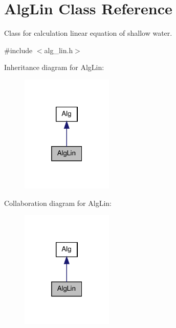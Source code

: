\hypertarget{classAlgLin}{
\section{AlgLin Class Reference}
\label{classAlgLin}
}


Class for calculation linear equation of shallow water.  




{\ttfamily \#include $<$alg\_\-lin.h$>$}



Inheritance diagram for AlgLin:
\nopagebreak
\begin{figure}[H]
\begin{center}
\leavevmode
\includegraphics[width=124pt]{classAlgLin__inherit__graph}
\end{center}
\end{figure}


Collaboration diagram for AlgLin:
\nopagebreak
\begin{figure}[H]
\begin{center}
\leavevmode
\includegraphics[width=124pt]{classAlgLin__coll__graph}
\end{center}
\end{figure}

